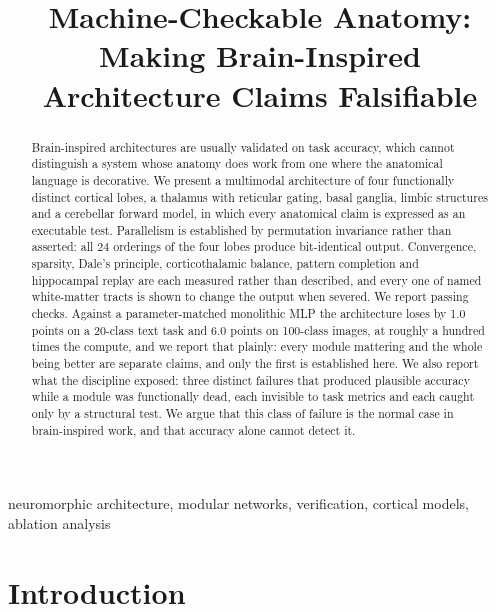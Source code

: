 \documentclass[conference]{IEEEtran}
\begin{document}
\title{Machine-Checkable Anatomy: Making Brain-Inspired\\
Architecture Claims Falsifiable}

\author{}

\maketitle

\begin{abstract}
Brain-inspired architectures are usually validated on task accuracy, which
cannot distinguish a system whose anatomy does work from one where the
anatomical language is decorative. We present a multimodal architecture of four
functionally distinct cortical lobes, a thalamus with reticular gating, basal
ganglia, limbic structures and a cerebellar forward model, in which every
anatomical claim is expressed as an executable test. Parallelism is established
by permutation invariance rather than asserted: all $24$ orderings of the four
lobes produce bit-identical output. Convergence, sparsity, Dale's principle,
corticothalamic balance, pattern completion and hippocampal replay are each
measured rather than described, and every one of \ArchitectureTracts{} named
white-matter tracts is shown to change the output when severed. We report
\GatesPassed{} passing checks. Against a parameter-matched monolithic MLP the
architecture loses by 1.0 points on a 20-class text task and 6.0 points on
100-class images, at roughly a hundred times the compute, and we report that
plainly:
every module mattering and the whole being better are separate claims, and only
the first is established here. We also report what the discipline exposed: three
distinct failures that produced plausible accuracy while a module was
functionally dead, each invisible to task metrics and each caught only by a
structural test. We argue that this class of failure is the normal case in
brain-inspired work, and that accuracy alone cannot detect it.
\end{abstract}

\begin{IEEEkeywords}
neuromorphic architecture, modular networks, verification, cortical models,
ablation analysis
\end{IEEEkeywords}

\section{Introduction}
\end{document}
